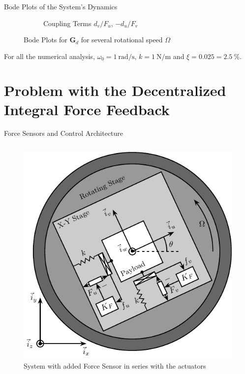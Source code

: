 \documentclass[t, minted]{clean-beamer}
\begin{document}
\begin{frame}[label={sec:orge87dc7b}]{Bode Plots of the System's Dynamics}
\begin{figure}[htbp]
\begin{subfigure}[c]{0.45\linewidth}
\caption{\label{fig:plant_compare_rotating_speed_coupling} Coupling Terms \(d_v/F_u\), \(-d_u/F_v\)}
\end{subfigure}
\hfill
\caption{Bode Plots for \(\bm{G}_d\) for several rotational speed \(\Omega\)}
\centering
\end{figure}

For all the numerical analysis, \(\omega_0 = \SI{1}{\radian\per\second}\), \(k = \SI{1}{\newton\per\meter}\) and \(\xi = 0.025 = \SI{2.5}{\percent}\).
\end{frame}

\section{Problem with the Decentralized Integral Force Feedback}
\label{sec:org59c3dbc}
\begin{frame}[label={sec:org6faf2d3}]{Force Sensors and Control Architecture}
\vspace{-1em}
\begin{columns}
\begin{column}{0.6\columnwidth}
\begin{figure}[htbp]
\centering
\includegraphics[width=\linewidth]{figs/system_iff.pdf}
\caption{System with added Force Sensor in series with the actuators}
\end{figure}
\end{column}


\end{columns}
\end{frame}
\end{document}

